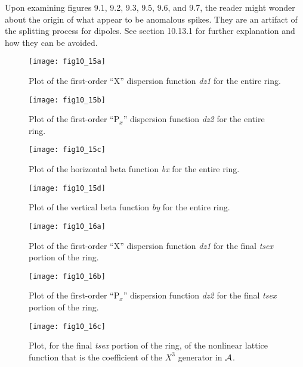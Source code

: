 Upon examining figures 9.1, 9.2, 9.3, 9.5, 9.6, and 9.7, the reader might
wonder about the origin of what appear to be anomalous spikes.  They are
an artifact of the splitting process for dipoles.  See section 10.13.1
for further explanation and how they can be avoided.

\newpage
\begin{figure}[htbp]
\renewcommand{\thefigure}{\thesection.\arabic{figure}}
  \centering
  \texttt{[image: fig10\_15a]}
  \caption{Plot of the first-order ``X'' dispersion function {\em dz1} for the
entire ring.}
\end{figure}

\newpage
\begin{figure}[htbp]
\renewcommand{\thefigure}{\thesection.\arabic{figure}}
  \centering
  \texttt{[image: fig10\_15b]}
  \caption{Plot of the first-order ``P$_x$'' dispersion function {\em dz2} for the
entire ring.}
\end{figure}

\newpage
\begin{figure}[htbp]
\renewcommand{\thefigure}{\thesection.\arabic{figure}}
  \centering
  \texttt{[image: fig10\_15c]}
  \caption{Plot of the horizontal beta function {\em bx} for the
entire ring.}
\end{figure}

\newpage
\begin{figure}[htbp]
\renewcommand{\thefigure}{\thesection.\arabic{figure}}
  \centering
  \texttt{[image: fig10\_15d]}
  \caption{Plot of the vertical beta function {\em by} for the
entire ring.}
\end{figure}

\newpage
\begin{figure}[htbp]
\renewcommand{\thefigure}{\thesection.\arabic{figure}}
  \centering
  \texttt{[image: fig10\_16a]}
  \caption{Plot of the first-order ``X'' dispersion function {\em dz1} for the
final {\em tsex} portion of the ring.}
\end{figure}

\newpage
\begin{figure}[htbp]
\renewcommand{\thefigure}{\thesection.\arabic{figure}}
  \centering
  \texttt{[image: fig10\_16b]}
  \caption{Plot of the first-order ``P$_x$'' dispersion function {\em dz2} for the
final {\em tsex} portion of the ring.}
\end{figure}

\newpage
\begin{figure}[htbp]
\renewcommand{\thefigure}{\thesection.\arabic{figure}}
  \centering
  \texttt{[image: fig10\_16c]}
  \caption{Plot, for the final {\em tsex} portion of the ring, of the nonlinear lattice function that is the coefficient of the
$X^3$ generator in ${\cal A}$.}
\end{figure}

